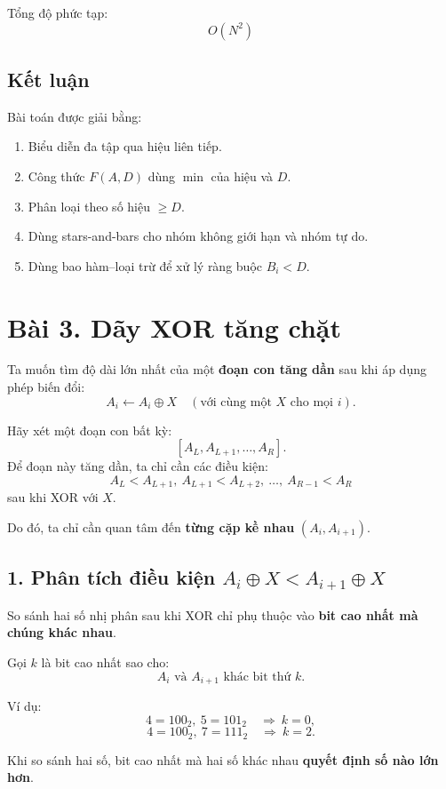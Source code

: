 Tổng độ phức tạp:
\[
\boxed{O(N^2)}
\]

\subsection*{Kết luận}
Bài toán được giải bằng:
\begin{enumerate}
    \item Biểu diễn đa tập qua hiệu liên tiếp.
    \item Công thức $F(A,D)$ dùng $\min$ của hiệu và $D$.
    \item Phân loại theo số hiệu $\ge D$.
    \item Dùng stars-and-bars cho nhóm không giới hạn và nhóm tự do.
    \item Dùng bao hàm--loại trừ để xử lý ràng buộc $B_i < D$.
\end{enumerate}

\newpage

\section*{Bài 3. Dãy XOR tăng chặt}

Ta muốn tìm độ dài lớn nhất của một \textbf{đoạn con tăng dần} sau khi áp dụng phép biến đổi:
\[
A_i \leftarrow A_i \oplus X \quad (\text{với cùng một } X \text{ cho mọi } i).
\]

Hãy xét một đoạn con bất kỳ:
\[
[A_L, A_{L+1}, \ldots, A_R].
\]
Để đoạn này tăng dần, ta chỉ cần các điều kiện:
\[
A_L < A_{L+1},\ A_{L+1} < A_{L+2},\ \ldots,\ A_{R-1} < A_R
\]
sau khi XOR với $X$.

Do đó, ta chỉ cần quan tâm đến \textbf{từng cặp kề nhau} $(A_i, A_{i+1})$.

\subsection*{1. Phân tích điều kiện $A_i \oplus X < A_{i+1} \oplus X$}

So sánh hai số nhị phân sau khi XOR chỉ phụ thuộc vào \textbf{bit cao nhất mà chúng khác nhau}.

Gọi $k$ là bit cao nhất sao cho:
\[
A_i \text{ và } A_{i+1} \text{ khác bit thứ } k.
\]

Ví dụ:
\[
4 = 100_2,\ 5 = 101_2 \quad\Rightarrow\ k = 0,
\]
\[
4 = 100_2,\ 7 = 111_2 \quad\Rightarrow\ k = 2.
\]

Khi so sánh hai số, bit cao nhất mà hai số khác nhau \textbf{quyết định số nào lớn hơn}.

